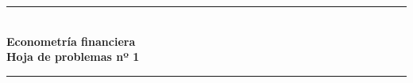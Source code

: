 \documentclass[12pt]{article}
\begin{document}
\VerbatimFootnotes %

\renewcommand*{\thefootnote}{\fnsymbol{footnote}} %


\begin{titlepage} %

	\newcommand{\HRule}{\rule{\linewidth}{0.5mm}} %
	
	\center %
	
	
	
	
	
	
	
	\HRule\\[0.4cm]
	
	{\Huge\bfseries Econometría financiera\\
	Hoja de problemas nº 1
	}\\[0.4cm] %
	
	\HRule\\[1.5cm]
	

\end{titlepage}
\end{document}
